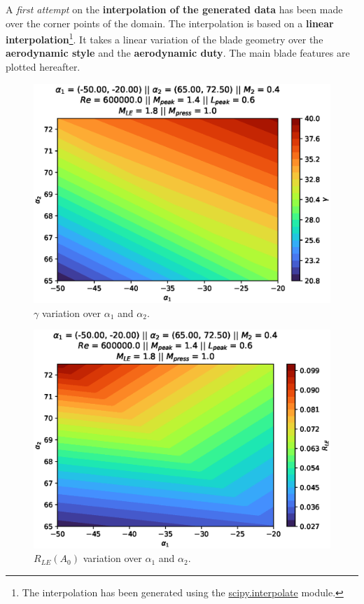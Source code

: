 A \textit{first attempt} on the \textbf{interpolation of the generated data} has been made over the corner points of the domain. The interpolation is based on a \textbf{linear interpolation}\footnote{The interpolation has been generated using the \href{https://docs.scipy.org/doc/scipy/reference/interpolate.html}{scipy.interpolate} module.}. It takes a linear variation of the blade geometry over the \textbf{aerodynamic style} and the \textbf{aerodynamic duty}. The main blade features are plotted hereafter.

\begin{figure}[!ht]
    \centering
    \includegraphics[scale=0.7]{figures/interpolation/alpha1alpha2stagger.eps}
    \caption{$\gamma$ variation over $\alpha_1$ and $\alpha_2$.}
\end{figure}

\begin{figure}[!ht]
    \centering
    \includegraphics[scale=0.7]{figures/interpolation/alpha1alpha2LEradius.eps}
    \caption{$R_{LE}(A_0)$ variation over $\alpha_1$ and $\alpha_2$.}
\end{figure}

